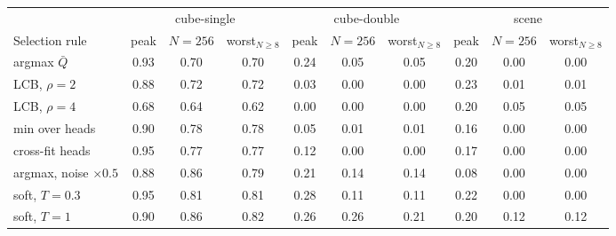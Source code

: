 \begin{tabular}{l ccc ccc ccc}
\toprule
 & \multicolumn{3}{c}{cube-single} & \multicolumn{3}{c}{cube-double} & \multicolumn{3}{c}{scene} \\
\cmidrule(lr){2-4}\cmidrule(lr){5-7}\cmidrule(lr){8-10}
Selection rule & peak & $N{=}256$ & worst$_{N\ge 8}$ & peak & $N{=}256$ & worst$_{N\ge 8}$ & peak & $N{=}256$ & worst$_{N\ge 8}$ \\
\midrule
argmax $\bar Q$ & 0.93 & 0.70 & 0.70 & 0.24 & 0.05 & 0.05 & 0.20 & 0.00 & 0.00 \\
LCB, $\rho{=}2$ & 0.88 & 0.72 & 0.72 & 0.03 & 0.00 & 0.00 & 0.23 & 0.01 & 0.01 \\
LCB, $\rho{=}4$ & 0.68 & 0.64 & 0.62 & 0.00 & 0.00 & 0.00 & 0.20 & 0.05 & 0.05 \\
min over heads & 0.90 & 0.78 & 0.78 & 0.05 & 0.01 & 0.01 & 0.16 & 0.00 & 0.00 \\
cross-fit heads & 0.95 & 0.77 & 0.77 & 0.12 & 0.00 & 0.00 & 0.17 & 0.00 & 0.00 \\
argmax, noise $\times 0.5$ & 0.88 & 0.86 & 0.79 & 0.21 & 0.14 & 0.14 & 0.08 & 0.00 & 0.00 \\
soft, $T{=}0.3$ & 0.95 & 0.81 & 0.81 & 0.28 & 0.11 & 0.11 & 0.22 & 0.00 & 0.00 \\
soft, $T{=}1$ & 0.90 & 0.86 & 0.82 & 0.26 & 0.26 & 0.21 & 0.20 & 0.12 & 0.12 \\
\bottomrule
\end{tabular}
